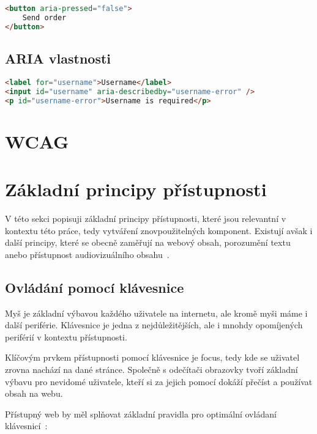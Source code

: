 \begin{lstlisting}[caption={Ukázka aria stavových attributů}, label={lst:example}, language=html]
<button aria-pressed="false">
    Send order
</button>
\end{lstlisting}

\subsection{ARIA vlastnosti}

\begin{lstlisting}[caption={Ukázka aria vlastností}, label={lst:example}, language=html]
<label for="username">Username</label>
<input id="username" aria-describedby="username-error" />
<p id="username-error">Username is required</p>
\end{lstlisting}

\section{WCAG}

\section{Základní principy přístupnosti}

V této sekci popisuji základní principy přístupnosti, které jsou relevantní v kontextu této práce, tedy vytváření znovpoužitelných komponent.
Existují avšak i další principy, které se obecně zaměřují na webový obsah, porozumění textu anebo přístupnost audiovizuálního obsahu~\cite{w3-accessibility-principles}.

\subsection{Ovládání pomocí klávesnice}

Myš je základní výbavou každého uživatele na internetu, ale kromě myši máme i další periférie.
Klávesnice je jedna z nejdůležitějších, ale i mnohdy opomíjených periférií v kontextu přístupnosti.


Klíčovým prvkem přístupnosti pomocí klávesnice je focus, tedy kde se uživatel zrovna nachází na dané stránce.
Společně s odečítači obrazovky tvoří základní výbavu pro nevidomé uživatele, kteří si za jejich pomocí dokáží přečíst a používat obsah na webu.

Přístupný web by měl splňovat základní pravidla pro optimální ovládaní klávesnicí~\cite{wcag-keyboard}:


